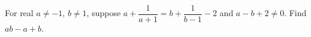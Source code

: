 For real $a\ne-1$, $b\ne1$, suppose $a+\dfrac{1}{a+1}=b+\dfrac{1}{b-1}-2$ and $a-b+2\ne0$. Find $ab-a+b$.
